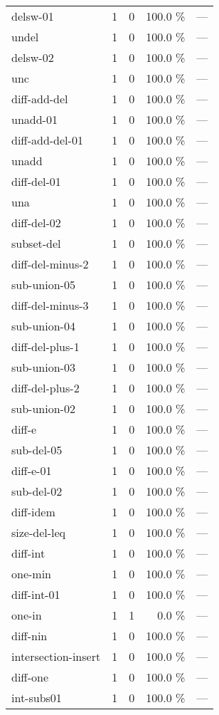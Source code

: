 \documentclass[a4paper]{article}
\begin{document}
\begin{supertabular}{l|r|r|r|r}
delsw-01 & 1 & 0 & 100.0 \% & ---\\
undel & 1 & 0 & 100.0 \% & ---\\
delsw-02 & 1 & 0 & 100.0 \% & ---\\
unc & 1 & 0 & 100.0 \% & ---\\
diff-add-del & 1 & 0 & 100.0 \% & ---\\
unadd-01 & 1 & 0 & 100.0 \% & ---\\
diff-add-del-01 & 1 & 0 & 100.0 \% & ---\\
unadd & 1 & 0 & 100.0 \% & ---\\
diff-del-01 & 1 & 0 & 100.0 \% & ---\\
una & 1 & 0 & 100.0 \% & ---\\
diff-del-02 & 1 & 0 & 100.0 \% & ---\\
subset-del & 1 & 0 & 100.0 \% & ---\\
diff-del-minus-2 & 1 & 0 & 100.0 \% & ---\\
sub-union-05 & 1 & 0 & 100.0 \% & ---\\
diff-del-minus-3 & 1 & 0 & 100.0 \% & ---\\
sub-union-04 & 1 & 0 & 100.0 \% & ---\\
diff-del-plus-1 & 1 & 0 & 100.0 \% & ---\\
sub-union-03 & 1 & 0 & 100.0 \% & ---\\
diff-del-plus-2 & 1 & 0 & 100.0 \% & ---\\
sub-union-02 & 1 & 0 & 100.0 \% & ---\\
diff-e & 1 & 0 & 100.0 \% & ---\\
sub-del-05 & 1 & 0 & 100.0 \% & ---\\
diff-e-01 & 1 & 0 & 100.0 \% & ---\\
sub-del-02 & 1 & 0 & 100.0 \% & ---\\
diff-idem & 1 & 0 & 100.0 \% & ---\\
size-del-leq & 1 & 0 & 100.0 \% & ---\\
diff-int & 1 & 0 & 100.0 \% & ---\\
one-min & 1 & 0 & 100.0 \% & ---\\
diff-int-01 & 1 & 0 & 100.0 \% & ---\\
one-in & 1 & 1 & 0.0 \% & ---\\
diff-nin & 1 & 0 & 100.0 \% & ---\\
intersection-insert & 1 & 0 & 100.0 \% & ---\\
diff-one & 1 & 0 & 100.0 \% & ---\\
int-subs01 & 1 & 0 & 100.0 \% & ---\\

\end{supertabular}
\end{document}
